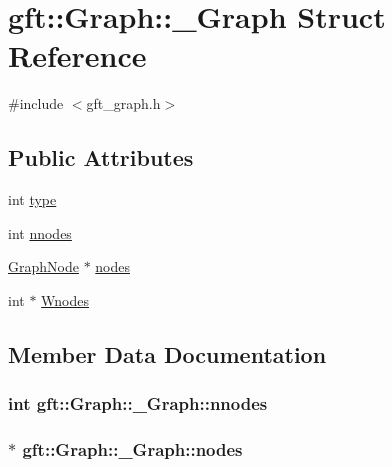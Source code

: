 \hypertarget{structgft_1_1Graph_1_1__Graph}{}\section{gft\+:\+:Graph\+:\+:\+\_\+\+Graph Struct Reference}
\label{structgft_1_1Graph_1_1__Graph}


{\ttfamily \#include $<$gft\+\_\+graph.\+h$>$}

\subsection*{Public Attributes}
\begin{DoxyCompactItemize}
\item 
int \hyperlink{structgft_1_1Graph_1_1__Graph_a6f711ac38406e18913feef0e7806dbca}{type}
\item 
int \hyperlink{structgft_1_1Graph_1_1__Graph_a3504f771eee3a7b3ef21651a336bb015}{nnodes}
\item 
\hyperlink{namespacegft_1_1Graph_a86c9c9e21a6c7f4770150ec13209cd89}{Graph\+Node} $\ast$ \hyperlink{structgft_1_1Graph_1_1__Graph_a13d1ded7d408ffe0fa891ed8cee4cc2d}{nodes}
\item 
int $\ast$ \hyperlink{structgft_1_1Graph_1_1__Graph_acc6b49e67d937d1007b619632b179cfc}{Wnodes}
\end{DoxyCompactItemize}


\subsection{Member Data Documentation}
\subsubsection[{\texorpdfstring{nnodes}{nnodes}}]{\setlength{\rightskip}{0pt plus 5cm}int gft\+::\+Graph\+::\+\_\+\+Graph\+::nnodes}\hypertarget{structgft_1_1Graph_1_1__Graph_a3504f771eee3a7b3ef21651a336bb015}{}\label{structgft_1_1Graph_1_1__Graph_a3504f771eee3a7b3ef21651a336bb015}
\subsubsection[{\texorpdfstring{nodes}{nodes}}]{$\ast$ gft\+::\+Graph\+::\+\_\+\+Graph\+::nodes}\hypertarget{structgft_1_1Graph_1_1__Graph_a13d1ded7d408ffe0fa891ed8cee4cc2d}{}\label{structgft_1_1Graph_1_1__Graph_a13d1ded7d408ffe0fa891ed8cee4cc2d}
